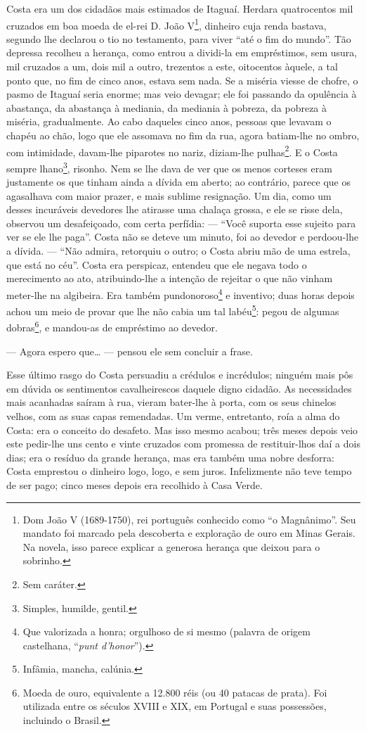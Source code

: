 Costa era um dos cidadãos mais estimados de Itaguaí. Herdara
quatrocentos mil cruzados em boa moeda de el-rei D. João V\footnote{Dom
  João V (1689-1750), rei português conhecido como ``o Magnânimo''. Seu
  mandato foi marcado pela descoberta e exploração de ouro em Minas
  Gerais. Na novela, isso parece explicar a generosa herança que deixou
  para o sobrinho.}, dinheiro cuja renda bastava, segundo lhe declarou o
tio no testamento, para viver ``até o fim do mundo''. Tão depressa
recolheu a herança, como entrou a dividi-la em empréstimos, sem usura,
mil cruzados a um, dois mil a outro, trezentos a este, oitocentos
àquele, a tal ponto que, no fim de cinco anos, estava sem nada. Se a
miséria viesse de chofre, o pasmo de Itaguaí seria enorme; mas veio
devagar; ele foi passando da opulência à abastança, da abastança à
mediania, da mediania à pobreza, da pobreza à miséria, gradualmente. Ao
cabo daqueles cinco anos, pessoas que levavam o chapéu ao chão, logo que
ele assomava no fim da rua, agora batiam-lhe no ombro, com intimidade,
davam-lhe piparotes no nariz, diziam-lhe pulhas\footnote{Sem caráter.}.
E o Costa sempre lhano\footnote{Simples, humilde, gentil.}, risonho. Nem
se lhe dava de ver que os menos corteses eram justamente os que tinham
ainda a dívida em aberto; ao contrário, parece que os agasalhava com
maior prazer, e mais sublime resignação. Um dia, como um desses
incuráveis devedores lhe atirasse uma chalaça grossa, e ele se risse
dela, observou um desafeiçoado, com certa perfídia: --- ``Você suporta
esse sujeito para ver se ele lhe paga''. Costa não se deteve um minuto,
foi ao devedor e perdoou-lhe a dívida. --- ``Não admira, retorquiu o
outro; o Costa abriu mão de uma estrela, que está no céu''. Costa era
perspicaz, entendeu que ele negava todo o merecimento ao ato,
atribuindo-lhe a intenção de rejeitar o que não vinham meter-lhe na
algibeira. Era também pundonoroso\footnote{Que valorizada a honra;
  orgulhoso de si mesmo (palavra de origem castelhana, ``\emph{punt
  d'honor}'').} e inventivo; duas horas depois achou um meio de provar
que lhe não cabia um tal labéu\footnote{Infâmia, mancha, calúnia.}:
pegou de algumas dobras\footnote{Moeda de ouro, equivalente a 12.800
  réis (ou 40 patacas de prata). Foi utilizada entre os séculos XVIII e
  XIX, em Portugal e suas possessões, incluindo o Brasil.}, e mandou-as
de empréstimo ao devedor.

--- Agora espero que\ldots{} --- pensou ele sem concluir a frase.

Esse último rasgo do Costa persuadiu a crédulos e incrédulos; ninguém
mais pôs em dúvida os sentimentos cavalheirescos daquele digno cidadão.
As necessidades mais acanhadas saíram à rua, vieram bater-lhe à porta,
com os seus chinelos velhos, com as suas capas remendadas. Um verme,
entretanto, roía a alma do Costa: era o conceito do desafeto. Mas isso
mesmo acabou; três meses depois veio este pedir-lhe uns cento e vinte
cruzados com promessa de restituir-lhos daí a dois dias; era o resíduo
da grande herança, mas era também uma nobre desforra: Costa emprestou o
dinheiro logo, logo, e sem juros. Infelizmente não teve tempo de ser
pago; cinco meses depois era recolhido à Casa Verde.

